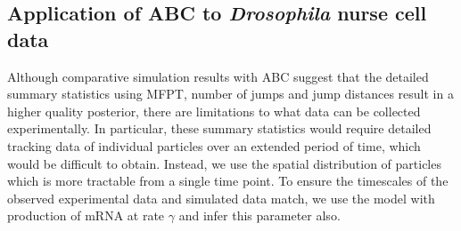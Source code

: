 \documentclass[twocolumn]{biophys}
\begin{document}
\subsection{Application of ABC to \textit{Drosophila} nurse cell data}
Although comparative simulation results with ABC suggest that the detailed summary statistics using MFPT, number of jumps and jump distances result in a higher quality posterior, there are limitations to what data can be collected experimentally.
In particular, these summary statistics would require detailed tracking data of individual particles over an extended period of time, which would be difficult to obtain. 
Instead, we use the spatial distribution of particles which is more tractable from a single time point.
To ensure the timescales of the observed experimental data and simulated data match, we use the model with production of mRNA at rate $\gamma$ and infer this parameter also.
\end{document}
